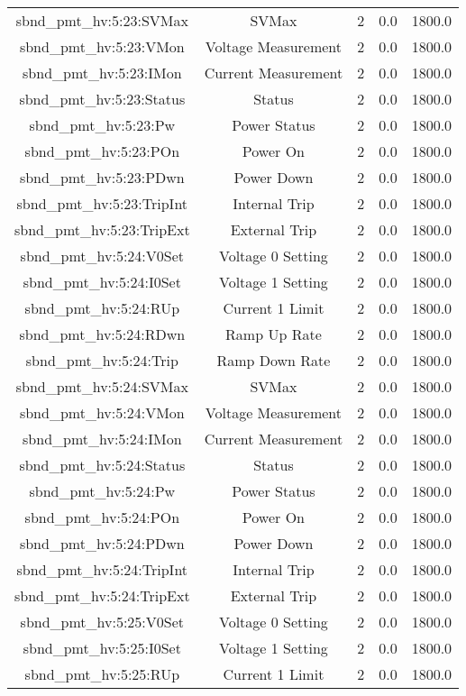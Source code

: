 \begin{center}
\begin{longtable}{c | c c c c }
sbnd\_pmt\_hv:5:23:SVMax & SVMax & 2 & 0.0 & 1800.0\\ 
sbnd\_pmt\_hv:5:23:VMon & Voltage Measurement & 2 & 0.0 & 1800.0\\ 
sbnd\_pmt\_hv:5:23:IMon & Current Measurement & 2 & 0.0 & 1800.0\\ 
sbnd\_pmt\_hv:5:23:Status & Status & 2 & 0.0 & 1800.0\\ 
sbnd\_pmt\_hv:5:23:Pw & Power Status & 2 & 0.0 & 1800.0\\ 
sbnd\_pmt\_hv:5:23:POn & Power On & 2 & 0.0 & 1800.0\\ 
sbnd\_pmt\_hv:5:23:PDwn & Power Down & 2 & 0.0 & 1800.0\\ 
sbnd\_pmt\_hv:5:23:TripInt & Internal Trip & 2 & 0.0 & 1800.0\\ 
sbnd\_pmt\_hv:5:23:TripExt & External Trip & 2 & 0.0 & 1800.0\\ 
sbnd\_pmt\_hv:5:24:V0Set & Voltage 0 Setting & 2 & 0.0 & 1800.0\\ 
sbnd\_pmt\_hv:5:24:I0Set & Voltage 1 Setting & 2 & 0.0 & 1800.0\\ 
sbnd\_pmt\_hv:5:24:RUp & Current 1 Limit & 2 & 0.0 & 1800.0\\ 
sbnd\_pmt\_hv:5:24:RDwn & Ramp Up Rate & 2 & 0.0 & 1800.0\\ 
sbnd\_pmt\_hv:5:24:Trip & Ramp Down Rate & 2 & 0.0 & 1800.0\\ 
sbnd\_pmt\_hv:5:24:SVMax & SVMax & 2 & 0.0 & 1800.0\\ 
sbnd\_pmt\_hv:5:24:VMon & Voltage Measurement & 2 & 0.0 & 1800.0\\ 
sbnd\_pmt\_hv:5:24:IMon & Current Measurement & 2 & 0.0 & 1800.0\\ 
sbnd\_pmt\_hv:5:24:Status & Status & 2 & 0.0 & 1800.0\\ 
sbnd\_pmt\_hv:5:24:Pw & Power Status & 2 & 0.0 & 1800.0\\ 
sbnd\_pmt\_hv:5:24:POn & Power On & 2 & 0.0 & 1800.0\\ 
sbnd\_pmt\_hv:5:24:PDwn & Power Down & 2 & 0.0 & 1800.0\\ 
sbnd\_pmt\_hv:5:24:TripInt & Internal Trip & 2 & 0.0 & 1800.0\\ 
sbnd\_pmt\_hv:5:24:TripExt & External Trip & 2 & 0.0 & 1800.0\\ 
sbnd\_pmt\_hv:5:25:V0Set & Voltage 0 Setting & 2 & 0.0 & 1800.0\\ 
sbnd\_pmt\_hv:5:25:I0Set & Voltage 1 Setting & 2 & 0.0 & 1800.0\\ 
sbnd\_pmt\_hv:5:25:RUp & Current 1 Limit & 2 & 0.0 & 1800.0\\ 

\end{longtable}
\end{center}
